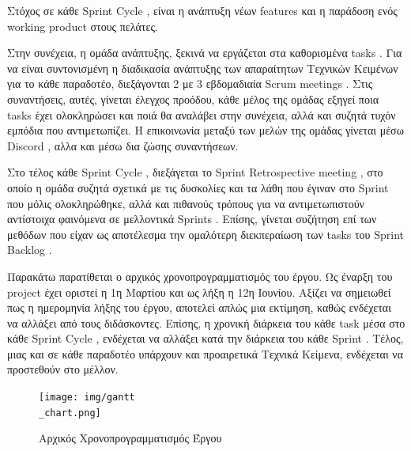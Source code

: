 \documentclass{../ol-softwaremanual}
\begin{document}
	Στόχος σε κάθε \en Sprint Cycle \gr , είναι η ανάπτυξη νέων \en features \gr και η παράδοση ενός \en working product \gr στους πελάτες. \\ 
	
	\vspace{5pt}
	
	Στην συνέχεια, η ομάδα ανάπτυξης, ξεκινά να εργάζεται στα καθορισμένα \en tasks \gr .
	Για να είναι συντονισμένη η διαδικασία ανάπτυξης των απαραίτητων Τεχνικών Κειμένων για το κάθε παραδοτέο, διεξάγονται 2 με 3 εβδομαδιαία \en Scrum meetings \gr . Στις συναντήσεις, αυτές, γίνεται έλεγχος προόδου, κάθε μέλος της ομάδας εξηγεί ποια \en tasks \gr έχει ολοκληρώσει και ποιά θα αναλάβει στην συνέχεια, αλλά και συζητά τυχόν εμπόδια που αντιμετωπίζει.
	Η επικοινωνία μεταξύ των μελών της ομάδας γίνεται μέσω \en Discord \gr, αλλα και μέσω δια ζώσης συναντήσεων. \\
	
	\vspace{5pt}
	
	Στο τέλος κάθε \en Sprint Cycle \gr , διεξάγεται το \en Sprint Retrospective meeting \gr , στο οποίο η ομάδα συζητά σχετικά με τις δυσκολίες και τα λάθη που έγιναν στο \en Sprint \gr που μόλις ολοκληρώθηκε, αλλά και πιθανούς τρόπους για να αντιμετωπιστούν αντίστοιχα φαινόμενα σε μελλοντικά \en Sprints \gr . Επίσης, γίνεται συζήτηση επί των μεθόδων που είχαν ως αποτέλεσμα την ομαλότερη διεκπεραίωση των \en tasks \gr του \en Sprint Backlog \gr .
	
	\newpage
	
		
		\flushleft
		
		Παρακάτω παρατίθεται ο αρχικός χρονοπρογραμματισμός του έργου. Ως έναρξη του \en project \gr έχει οριστεί η 1η Μαρτίου και ως λήξη η 12η Ιουνίου. Αξίζει να σημειωθεί πως η ημερομηνία λήξης του έργου, αποτελεί απλώς μια εκτίμηση, καθώς ενδέχεται να αλλάξει από τους διδάσκοντες. Επίσης, η χρονική διάρκεια του κάθε \en task \gr μέσα στο κάθε \en Sprint Cycle \gr, ενδέχεται να αλλάξει κατά την διάρκεια του κάθε \en Sprint \gr . Τέλος, μιας και σε κάθε παραδοτέο υπάρχουν και προαιρετικά Τεχνικά Κείμενα, ενδέχεται να προστεθούν στο μέλλον.
	
	
		\begin{figure}[htbp!]
			
			\texttt{[image: img/gantt\\\_chart.png]}
			\caption{Αρχικός Χρονοπρογραμματισμός Έργου}
			
			
		\end{figure}
	
\end{document}
